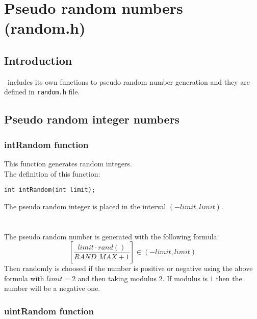 %
%

\chapter{Pseudo random numbers (random.h)} \label{ch:random}

\section{Introduction}

\BI \ includes its own functions to pseudo random number generation and they are defined in \texttt{random.h} file.\\


\section{Pseudo random integer numbers}

\subsection{\textbf{intRandom} function} \label{sec:intRandom}

This function generates random integers.\\

The definition of this function:
%
\begin{verbatim}
int intRandom(int limit);  
\end{verbatim}
%
The pseudo random integer is placed in the interval $(-limit,limit)$.\\ \\
%
%
\ \\
%
The pseudo random number is generated with the following formula:
%
\begin{displaymath}
\left[ \frac{limit \cdot rand()}{RAND\_MAX + 1} \right] \in (-limit,limit)
\end{displaymath}
%
Then randomly is choosed if the number is positive or negative using the above formula with $limit=2$ and then taking modulus $2$. If modulus is $1$ then the number will be a negative one.

\subsection{\textbf{uintRandom} function} \label{sec:uintRandom}

